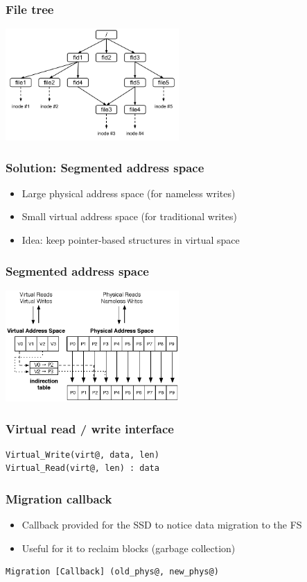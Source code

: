 \documentclass{beamer}
\begin{document}
\begin{frame}
  \frametitle{File tree}
  \begin{center}
  \includegraphics[width=250px]{file_tree.png}
  \end{center}
\end{frame}

\begin{frame}
  \frametitle{Solution: Segmented address space}
  \begin{itemize}
    \item Large physical address space (for nameless writes)
    \item Small virtual address space (for traditional writes)
    \item Idea: keep pointer-based structures in virtual space
  \end{itemize}
\end{frame}

\begin{frame}
  \frametitle{Segmented address space}
  \begin{center}
  \includegraphics[width=250px]{segmented.png}
  \end{center}
\end{frame}

\begin{frame}[fragile]
  \frametitle{Virtual read / write interface}
  \begin{lstlisting}
Virtual_Write(virt@, data, len)
Virtual_Read(virt@, len) : data
  \end{lstlisting}
\end{frame}

\begin{frame}[fragile]
  \frametitle{Migration callback}
  \begin{itemize}
    \item Callback provided for the SSD to notice data migration to the FS
    \item Useful for it to reclaim blocks (garbage collection)
  \end{itemize}
  \begin{lstlisting}
Migration [Callback] (old_phys@, new_phys@)
  \end{lstlisting}
\end{frame}
\end{document}
